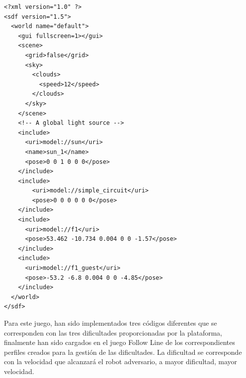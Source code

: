 \documentclass[a4paper, 12pt]{book}
\begin{document}
\begin{lstlisting}[basicstyle=\ttfamily\scriptsize]
<?xml version="1.0" ?>
<sdf version="1.5">
  <world name="default">
    <gui fullscreen=1></gui>
    <scene>
      <grid>false</grid>
      <sky>
        <clouds>
          <speed>12</speed>
        </clouds>
      </sky>
    </scene>
    <!-- A global light source -->
    <include>
      <uri>model://sun</uri>
      <name>sun_1</name>
      <pose>0 0 1 0 0 0</pose>
    </include>
    <include>
	    <uri>model://simple_circuit</uri>
	    <pose>0 0 0 0 0 0</pose>
    </include>
    <include>
      <uri>model://f1</uri>
      <pose>53.462 -10.734 0.004 0 0 -1.57</pose>
    </include>
    <include>
      <uri>model://f1_guest</uri>
      <pose>-53.2 -6.8 0.004 0 0 -4.85</pose>
    </include>
  </world>
</sdf>
\end{lstlisting}

Para este juego, han sido implementados tres códigos diferentes que se corresponden con las tres dificultades proporcionadas por la plataforma, finalmente han sido cargados en el juego Follow Line de los correspondientes perfiles creados para la gestión de las dificultades. La dificultad se corresponde con la velocidad que alcanzará el robot adversario, a mayor dificultad, mayor velocidad.
\end{document}
